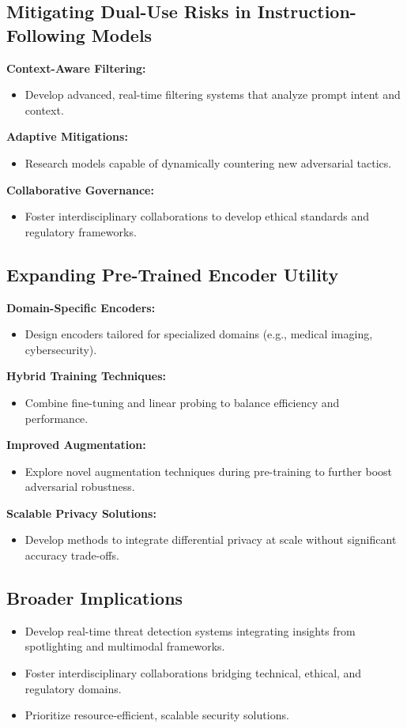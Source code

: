 \documentclass[journal]{IEEEtran}  %
\begin{document}
\subsection{Mitigating Dual-Use Risks in Instruction-Following Models}
\textbf{Context-Aware Filtering:}
\begin{itemize}
    \item Develop advanced, real-time filtering systems that analyze prompt intent and context.
\end{itemize}
\textbf{Adaptive Mitigations:}
\begin{itemize}
    \item Research models capable of dynamically countering new adversarial tactics.
\end{itemize}
\textbf{Collaborative Governance:}
\begin{itemize}
    \item Foster interdisciplinary collaborations to develop ethical standards and regulatory frameworks.
\end{itemize}

\subsection{Expanding Pre-Trained Encoder Utility}
\textbf{Domain-Specific Encoders:}
\begin{itemize}
    \item Design encoders tailored for specialized domains (e.g., medical imaging, cybersecurity).
\end{itemize}
\textbf{Hybrid Training Techniques:}
\begin{itemize}
    \item Combine fine-tuning and linear probing to balance efficiency and performance.
\end{itemize}
\textbf{Improved Augmentation:}
\begin{itemize}
    \item Explore novel augmentation techniques during pre-training to further boost adversarial robustness.
\end{itemize}
\textbf{Scalable Privacy Solutions:}
\begin{itemize}
    \item Develop methods to integrate differential privacy at scale without significant accuracy trade-offs.
\end{itemize}

\subsection{Broader Implications}
\begin{itemize}
    \item Develop real-time threat detection systems integrating insights from spotlighting and multimodal frameworks.
    \item Foster interdisciplinary collaborations bridging technical, ethical, and regulatory domains.
    \item Prioritize resource-efficient, scalable security solutions.
\end{itemize}
\end{document}
